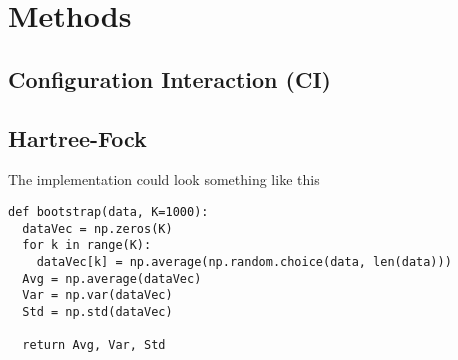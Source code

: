 \section{Methods} \label{sec:methods}

\subsection{Configuration Interaction (CI)}

\subsection{Hartree-Fock}

The implementation could look something like this
\lstset{basicstyle=\scriptsize}
\begin{lstlisting}
def bootstrap(data, K=1000):
  dataVec = np.zeros(K)
  for k in range(K):
    dataVec[k] = np.average(np.random.choice(data, len(data)))
  Avg = np.average(dataVec)
  Var = np.var(dataVec)
  Std = np.std(dataVec)
    
  return Avg, Var, Std
\end{lstlisting}
